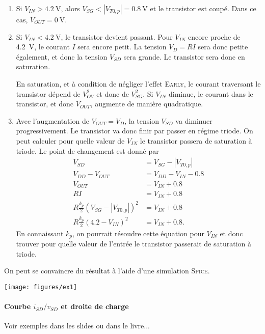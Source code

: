 \documentclass[frenchb,DIV=13]{scrartcl}
\begin{document}
\begin{enumerate}
	\item Si $V_{IN} > \SI{4.2}{\volt}$, alors $V_{SG} < |V_{T0,p}| = \SI{0.8}{\volt}$
	et le transistor est coupé. Dans ce cas, $V_{OUT} = \SI{0}{\volt}$.
	\item Si $V_{IN} < \SI{4.2}{\volt}$, le transistor devient passant. Pour
	$V_{IN}$ encore proche de \SI{4.2}{\volt}, le courant $I$ sera encore
	petit. La tension $V_D = RI$ sera donc petite également, et donc la tension
	$V_{SD}$ sera grande. Le transistor sera donc en saturation.
	
	En saturation, et à condition de négliger l'effet \textsc{Early}, le courant
	traversant le transistor dépend de $V_{OV}^2$ et donc de $V_{SG}^2$. Si $V_{IN}$
	diminue, le courant dans le transistor, et donc $V_{OUT}$, augmente de manière
	quadratique.
	\item Avec l'augmentation de $V_{OUT} = V_D$, la tension $V_{SD}$ va diminuer
	progressivement. Le transistor va donc finir par passer en régime triode.
	On peut calculer pour quelle valeur de $V_{IN}$ le transistor passera de saturation
	à triode. Le point de changement est donné par
	\begin{align*}
		 V_{SD} & = V_{SG} - |V_{T0,p}| \\
		 V_{DD} - V_{OUT} & = V_{DD} - V_{IN} - 0.8 \\
		 V_{OUT} & = V_{IN} + 0.8 \\
		 RI & = V_{IN} + 0.8 \\
		 R\frac{k_p}{2}(V_{SG} - |V_{T0,p}|)^2 & = V_{IN} + 0.8 \\
		 R\frac{k_p}{2}(4.2 - V_{IN})^2 & = V_{IN} + 0.8.
	\end{align*}
	En connaissant $k_p$, on pourrait résoudre cette équation pour $V_{IN}$ et donc
	trouver pour quelle valeur de l'entrée le transistor passerait de saturation à triode.
\end{enumerate}

On peut se convaincre du résultat à l'aide d'une simulation \textsc{Spice}.

\begin{center}
	\texttt{[image: figures/ex1]}
\end{center}
	
\paragraph{Courbe $i_{SD}/v_{SD}$ et droite de charge}
Voir exemples dans les slides ou dans le livre...
\end{document}
